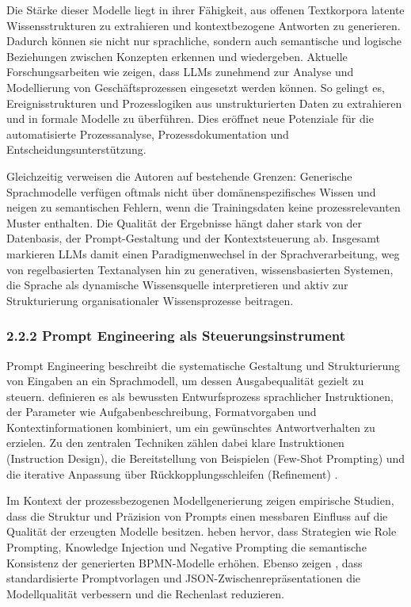 \documentclass[a4paper,12pt]{scrreprt}
\begin{document}
Die Stärke dieser Modelle liegt in ihrer Fähigkeit, aus offenen Textkorpora latente Wissensstrukturen zu extrahieren und kontextbezogene Antworten zu generieren. 
Dadurch können sie nicht nur sprachliche, sondern auch semantische und logische Beziehungen zwischen Konzepten erkennen und wiedergeben. 
Aktuelle Forschungsarbeiten wie \citep[S.~99--100]{Moeller2025} zeigen, dass \acp{LLM} zunehmend zur Analyse und Modellierung von Geschäftsprozessen eingesetzt werden können. 
So gelingt es, Ereignisstrukturen und Prozesslogiken aus unstrukturierten Daten zu extrahieren und in formale Modelle zu überführen. 
Dies eröffnet neue Potenziale für die automatisierte Prozessanalyse, Prozessdokumentation und Entscheidungsunterstützung.

Gleichzeitig verweisen die Autoren auf bestehende Grenzen: 
Generische Sprachmodelle verfügen oftmals nicht über domänenspezifisches Wissen und neigen zu semantischen Fehlern, wenn die Trainingsdaten keine prozessrelevanten Muster enthalten. 
Die Qualität der Ergebnisse hängt daher stark von der Datenbasis, der Prompt-Gestaltung und der Kontextsteuerung ab. 
Insgesamt markieren \acp{LLM} damit einen Paradigmenwechsel in der Sprachverarbeitung, weg von regelbasierten Textanalysen hin zu generativen, wissensbasierten Systemen, die Sprache als dynamische Wissensquelle interpretieren und aktiv zur Strukturierung organisationaler Wissensprozesse beitragen.

\subsubsection*{2.2.2 Prompt Engineering als Steuerungsinstrument}

Prompt Engineering beschreibt die systematische Gestaltung und Strukturierung von Eingaben an ein Sprachmodell, um dessen Ausgabequalität gezielt zu steuern. 
\citet[S.~485--489]{Hsu2024} definieren es als bewussten Entwurfsprozess sprachlicher Instruktionen, der Parameter wie Aufgabenbeschreibung, Formatvorgaben und Kontextinformationen kombiniert, um ein gewünschtes Antwortverhalten zu erzielen. 
Zu den zentralen Techniken zählen dabei klare Instruktionen (Instruction Design), die Bereitstellung von Beispielen (Few-Shot Prompting) und die iterative Anpassung über Rückkopplungsschleifen (Refinement) \citep[S.~486--488]{Hsu2024}. 

Im Kontext der prozessbezogenen Modellgenerierung zeigen empirische Studien, dass die Struktur und Präzision von Prompts einen messbaren Einfluss auf die Qualität der erzeugten Modelle besitzen. 
\citet[S.~5--7]{Kourani2024} heben hervor, dass Strategien wie Role Prompting, Knowledge Injection und Negative Prompting die semantische Konsistenz der generierten BPMN-Modelle erhöhen. 
Ebenso zeigen \citet[S.~3--4]{KoepkeSafan2024}, dass standardisierte Promptvorlagen und JSON-Zwischenrepräsentationen die Modellqualität verbessern und die Rechenlast reduzieren. 
\end{document}

